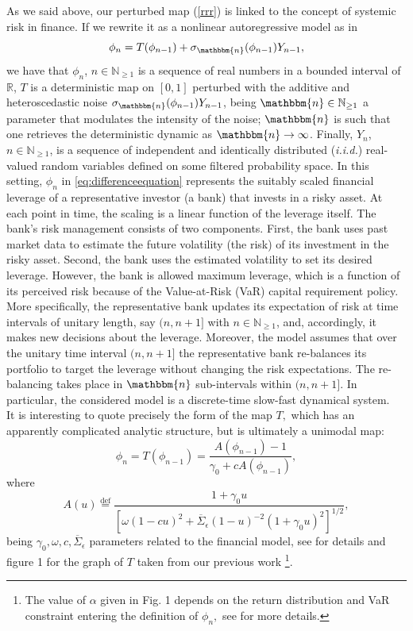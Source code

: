 \documentclass{article}
\newcommand{\n}{\mathbbm{n}}
\newcommand{\1}{\mathbbm{1}}
\begin{document}
As we said above, our perturbed map (\ref{rrr}) is linked to the concept of systemic risk in finance. If we rewrite it as a nonlinear autoregressive model as in \cite{lillo22}  
\begin{equation}\label{eq:differenceequation}
    \phi_n = T(\phi_{n-1}) + \sigma_{\n}(\phi_{n-1})Y_{n-1}, 
\end{equation}
we have that  $\phi_n$, $n \in \mathbb{N}_{\geq 1}$ is a sequence of real numbers in a bounded interval of $\mathbb{R}$, $T$ is a deterministic map on $[0,1]$ perturbed with the additive and heteroscedastic noise $\sigma_{\n}(\phi_{n-1})Y_{n-1}$, being $\n \in \mathbb{N}_{\geq 1}$ a parameter that modulates the intensity of the noise; $\n$ is such that one retrieves the deterministic dynamic as $\n \rightarrow \infty$. Finally, $Y_n$, $n \in \mathbb{N}_{\geq 1}$, is a sequence of independent and identically distributed (\textit{i.i.d.}) real-valued random variables defined on some filtered probability space. 
In this setting, $\phi_n$ in \eqref{eq:differenceequation} represents the suitably scaled financial leverage of a representative investor (a bank) that invests in a risky asset. At each point in time, the scaling is a linear function of the leverage itself. The bank's risk management consists of two components. First, the bank uses past market data to estimate the future volatility (the risk) of its investment in the risky asset. Second, the bank uses the estimated volatility to set its desired leverage. However, the bank is allowed maximum leverage, which is a function of its perceived risk because of the Value-at-Risk (VaR) capital requirement policy. More specifically, the representative bank updates its expectation of risk at time intervals of unitary length, say $(n, n + 1]$ with $n\in\mathbb{N}_{\geq 1}$, and, accordingly, it makes new decisions about the leverage. Moreover, the model assumes that over the unitary time interval $(n, n + 1]$ the representative bank re-balances its portfolio to target the leverage without changing the risk expectations. The re-balancing takes place in $\n$
sub-intervals within $(n, n+ 1]$.  In particular, the
considered model is a discrete-time slow-fast dynamical system.\\
It is interesting to quote precisely the  form of the map $T,$ which has an apparently complicated analytic structure, but is ultimately a unimodal map:
$$
\phi_n= T(\phi_{n-1})=\frac{A(\phi_{n-1})-1}{\gamma_0+cA(\phi_{n-1})},
$$
where 
$$
 A(u)\overset{\text{def}}{=}\frac{1+\gamma_0 u}{[\omega(1-c u)^2 + \overline{\Sigma}_{\epsilon}(1-u)^{-2}(1+\gamma_0 u)^2]^{1/2}},
$$
being $\gamma_0, \omega, c, \overline{\Sigma}_{\epsilon}$ parameters related to the financial model, see \cite{lillo22} for details and figure 1 for the graph of $T$ taken from our previous work \cite{lillo22}\footnote{The value of $\alpha$ given in Fig. 1 depends on the return distribution and VaR constraint entering the definition of $\phi_n,$ see \cite{lillo22} for more details.}.\\
\end{document}
